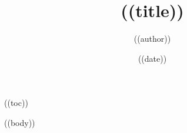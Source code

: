 \documentclass[10pt,a4paper]{article}
\title{\bfseries ((title))}
\author{((author))}
\date{((date))}
\begin{document}
\maketitle

((toc))

((body))
\end{document}
